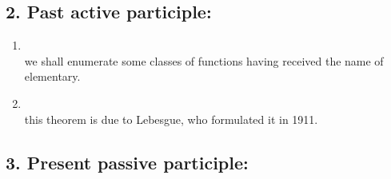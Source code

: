 \subsection*{2. Past active participle: }

\begin{enumerate}[label=2.\arabic*)]
\item {}\\
      we shall enumerate some classes of functions having received the name of elementary.
\item {}\\
      this theorem is due to Lebesgue, who formulated it in 1911.
\end{enumerate}

\subsection*{3. Present passive participle: }

